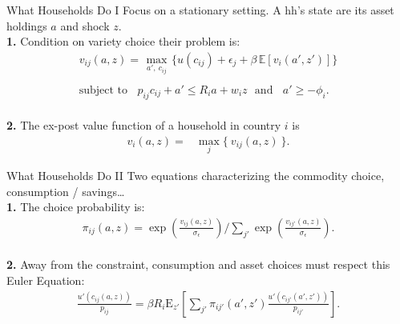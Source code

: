 \documentclass[9pt,pdftex,aspectratio=1610]{beamer}
\theoremstyle{definition}
\begin{document}

\begin{frame}[t]{What Households Do I}
\smallskip
Focus on a stationary setting. A hh's state are its asset holdings $a$ and shock $z$.\\
\bigskip
\textbf{1.} Condition on variety choice their problem is:
\begin{align}
v_{ij}(a, z) =   \max_{\ a', \ c_{ij}  \ }\bigg  \{ u(c_{ij}) + \epsilon_{j}  + \beta \, \mathbb{E} [v_{i}(a', z')]  \bigg\} \nonumber \\
\nonumber \\
\mbox{subject to}  \ \ \  \  p_{ij}c_{ij} +  a' \leq    R_{i} a + w_{i} z \ \ \  \mbox{and} \ \ \ \ a' \geq - \phi_{i}. \nonumber
\end{align}\\
\bigskip
\medskip
\textbf{2.} The ex-post value function of a household in country $i$ is
\begin{align}
v_{i}(a, z) = &  \max_{j} \big  \{ \  v_{ij}(a, z)  \ \big \}. \nonumber
\end{align}
\end{frame}


\begin{frame}[t]{What Households Do II}
\smallskip
Two equations characterizing the commodity choice, consumption / savings\ldots\\
\bigskip
\textbf{1.} The choice probability is:
\begin{align*}
\pi_{ij}(a, z) = \exp \left( \frac{ v_{ij}(a, z) }{\sigma_{\epsilon}} \right) \Bigg / \sum_{j'} \exp \left( \frac{ v_{ij'}(a, z) }{\sigma_{\epsilon}} \right).
\end{align*}
\\
\bigskip
\bigskip
\textbf{2.} Away from the constraint, consumption and asset choices must respect this Euler Equation:
\begin{align*}
\frac{u'(c_{ij}(a, z))}{p_{ij}} = \beta R_{i} \mathrm{E}_{z'} \left[ \sum_{j'} \pi_{ij'}(a', z') \frac{u'(c_{ij'}(a', z'))}{p_{ij'}} \right].
\end{align*}
\end{frame}
\end{document}
